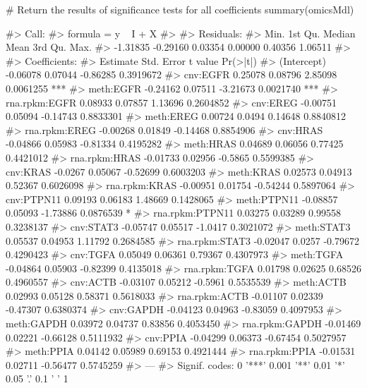 \begin{Schunk}
\begin{Sinput}
# Return the results of significance tests for all coefficients 
summary(omicsMdl)
\end{Sinput}
\begin{Soutput}
#> Call: 
#> formula =  y ~ I + X
#> 
#> Residuals: 
#>     Min.  1st Qu.   Median     Mean  3rd Qu.     Max. 
#> -1.31835 -0.29160  0.03354  0.00000  0.40356  1.06511 
#> 
#> Coefficients: 
#>                 Estimate Std. Error  t value  Pr(>|t|)    
#> (Intercept)     -0.06078    0.07044 -0.86285 0.3919672    
#> cnv:EGFR         0.25078    0.08796  2.85098 0.0061255 ***
#> meth:EGFR       -0.24162    0.07511 -3.21673 0.0021740 ***
#> rna.rpkm:EGFR    0.08933    0.07857  1.13696 0.2604852    
#> cnv:EREG        -0.00751    0.05094 -0.14743 0.8833301    
#> meth:EREG        0.00724     0.0494  0.14648 0.8840812    
#> rna.rpkm:EREG   -0.00268    0.01849 -0.14468 0.8854906    
#> cnv:HRAS        -0.04866    0.05983 -0.81334 0.4195282    
#> meth:HRAS        0.04689    0.06056  0.77425 0.4421012    
#> rna.rpkm:HRAS   -0.01733    0.02956  -0.5865 0.5599385    
#> cnv:KRAS         -0.0267    0.05067 -0.52699 0.6003203    
#> meth:KRAS        0.02573    0.04913  0.52367 0.6026098    
#> rna.rpkm:KRAS   -0.00951    0.01754 -0.54244 0.5897064    
#> cnv:PTPN11       0.09193    0.06183  1.48669 0.1428065    
#> meth:PTPN11     -0.08857    0.05093 -1.73886 0.0876539   *
#> rna.rpkm:PTPN11  0.03275    0.03289  0.99558 0.3238137    
#> cnv:STAT3       -0.05747    0.05517  -1.0417 0.3021072    
#> meth:STAT3       0.05537    0.04953  1.11792 0.2684585    
#> rna.rpkm:STAT3  -0.02047     0.0257 -0.79672 0.4290423    
#> cnv:TGFA         0.05049    0.06361  0.79367 0.4307973    
#> meth:TGFA       -0.04864    0.05903 -0.82399 0.4135018    
#> rna.rpkm:TGFA    0.01798    0.02625  0.68526 0.4960557    
#> cnv:ACTB        -0.03107    0.05212  -0.5961 0.5535539    
#> meth:ACTB        0.02993    0.05128  0.58371 0.5618033    
#> rna.rpkm:ACTB   -0.01107    0.02339 -0.47307 0.6380374    
#> cnv:GAPDH       -0.04123    0.04963 -0.83059 0.4097953    
#> meth:GAPDH       0.03972    0.04737  0.83856 0.4053450    
#> rna.rpkm:GAPDH  -0.01469    0.02221 -0.66128 0.5111932    
#> cnv:PPIA        -0.04299    0.06373 -0.67454 0.5027957    
#> meth:PPIA        0.04142    0.05989  0.69153 0.4921444    
#> rna.rpkm:PPIA   -0.01531    0.02711 -0.56477 0.5745259    
#> ---
#>  Signif. codes:  0 '***' 0.001 '**' 0.01 '*' 0.05 '.' 0.1 ' ' 1
\end{Soutput}
\end{Schunk}

